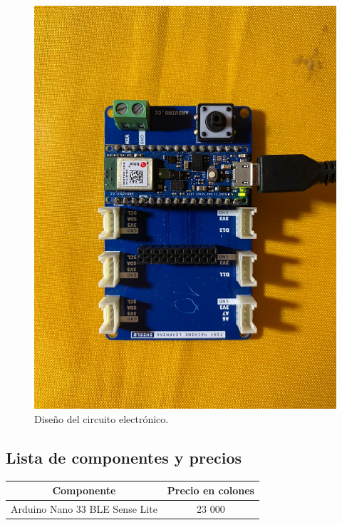     \begin{figure}[H]
        \centering
        \includegraphics[width=0.5\linewidth]{pics/diseno.jpeg}
        \caption{Diseño del circuito electrónico.}
        \label{diseno}
    \end{figure}


\subsection{Lista de componentes y precios}

\begin{table}[H]
\centering
\begin{tabular}{ll}
\hline
\multicolumn{1}{|c|}{Componente}          & \multicolumn{1}{c|}{Precio en colones} \\ \hline
\multicolumn{1}{|c|}{Arduino Nano 33 BLE Sense Lite} & \multicolumn{1}{c|}{23 000}            \\ \hline

\end{tabular}
\end{table}


